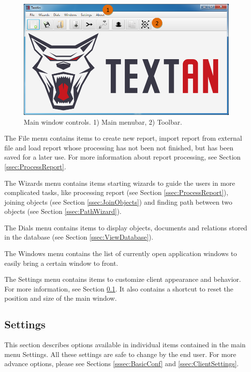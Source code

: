 \begin{figure}[!htb]
        \centering
        \includegraphics[width=\textwidth]{Images/main}
        \caption{Main window controls. 1) Main menubar, 2) Toolbar.}
        \label{fig:MainWindow}
\end{figure}

The File menu contains items to create new report, import report from external
file and load report whose processing has not been not finished, but has been
saved for a later use. For more information about report processing, see
Section \ref{ssec:ProcessReport}.

The Wizards menu contains items starting wizards to guide the users in more
complicated tasks, like processing report (see Section
\ref{ssec:ProcessReport}), joining objects (see Section \ref{ssec:JoinObjects})
and finding path between two objects (see Section \ref{ssec:PathWizard}).

The Dials  menu contains items to display objects,
documents and relations stored in the database (see Section
\ref{ssec:ViewDatabase}).

The Windows menu contains the list of currently open application windows
to easily bring a certain window to front.

The Settings menu contains items to customize \textan{} client appearance and
behavior. For more information, see Section \ref{ssec:Settings}. It also
contains a shortcut to reset the position and size of the main window.

\subsection{Settings}
\label{ssec:Settings}

This section describes options available in individual items contained in the
main menu Settings. All these settings are safe to change by the end user. For
more advance options, please see Sections \ref{sssec:BasicConf} and
\ref{ssec:ClientSettings}.

